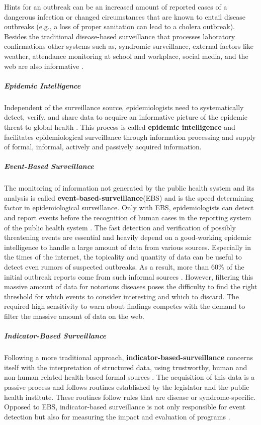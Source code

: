 Hints for an outbreak can be an increased amount of reported cases of a dangerous infection or changed circumstances that are known to entail disease outbreaks (e.g., a loss of proper sanitation can lead to a cholera outbreak).
Besides the traditional disease-based surveillance that processes laboratory confirmations other systems such as, syndromic surveillance, external factors like weather, attendance monitoring at school and workplace, social media, and the web are also informative \citep{EarlyDetection}.

\subparagraph{Epidemic Intelligence}
Independent of the surveillance source, epidemiologists need to systematically detect, verify, and share data to acquire an informative picture of the epidemic threat to global health \citep{EarlyDetection}.
This process is called \textbf{epidemic intelligence} and facilitates epidemiological surveillance through information processing and supply of formal, informal, actively and passively acquired information.


\subparagraph{Event-Based Surveillance}
The monitoring of information not generated by the public health system and its analysis is called \textbf{event-based-surveillance}(\gls{EBS}) and is the speed determining factor in epidemiological surveillance.
Only with EBS, epidemiologists can detect and report events before the recognition of human cases in the reporting system of the public health system \citep{EarlyDetection}.
The fast detection and verification of possibly threatening events are essential and heavily depend on a good-working epidemic intelligence to handle a large amount of data from various sources.
Especially in the times of the internet, the topicality and quantity of data can be useful to detect even rumors of suspected outbreaks.
As a result, more than 60\% of the initial outbreak reports come from such informal sources \citep{EpiSurv}.
However, filtering this massive amount of data for notorious diseases poses the difficulty to find the right threshold for which events to consider interesting and which to discard.
The required high sensitivity to warn about findings competes with the demand to filter the massive amount of data on the web.

\subparagraph{Indicator-Based Surveillance}
Following a more traditional approach, \textbf{indicator-based-surveillance} concerns itself with the interpretation of structured data, using trustworthy, human and non-human related health-based formal sources \citep{EarlyDetection}.
The acquisition of this data is a passive process and follows routines established by the legislator and the public health institute.
These routines follow rules that are disease or syndrome-specific.
Opposed to EBS, indicator-based surveillance is not only responsible for event detection but also for measuring the impact and evaluation of programs \citep{EarlyDetection}.

